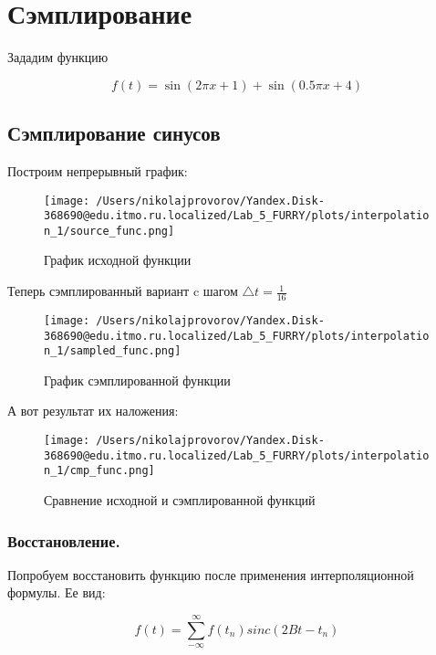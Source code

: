\section{Сэмплирование}

Зададим функцию

\begin{equation}
    f(t) = \sin(2\pi x + 1) + \sin(0.5\pi x + 4)
\end{equation}

\subsection{Сэмплирование синусов}

Построим непрерывный график: 

\begin{figure}[ht]
    \centering
    \texttt{[image: /Users/nikolajprovorov/Yandex.Disk-368690@edu.itmo.ru.localized/Lab\_5\_FURRY/plots/interpolation\_1/source\_func.png]}
    \caption{График исходной функции}
\end{figure}

\clearpage

Теперь сэмплированный вариант c шагом $\triangle t = \frac{1}{16}$

\begin{figure}[ht!]
    \centering
    \texttt{[image: /Users/nikolajprovorov/Yandex.Disk-368690@edu.itmo.ru.localized/Lab\_5\_FURRY/plots/interpolation\_1/sampled\_func.png]}
    \caption{График сэмплированной функции}
\end{figure}

А вот результат их наложения:

\begin{figure}[ht!]
    \centering
    \texttt{[image: /Users/nikolajprovorov/Yandex.Disk-368690@edu.itmo.ru.localized/Lab\_5\_FURRY/plots/interpolation\_1/cmp\_func.png]}
    \caption{Сравнение исходной и сэмплированной функций}
\end{figure}

\clearpage

\subsubsection{Восстановление.}

Попробуем восстановить функцию после применения интерполяционной формулы. Ее вид:

\begin{equation}
    f(t) = \sum_{-\infty}^{\infty}f(t_n)sinc(2Bt-t_n)
\end{equation}

